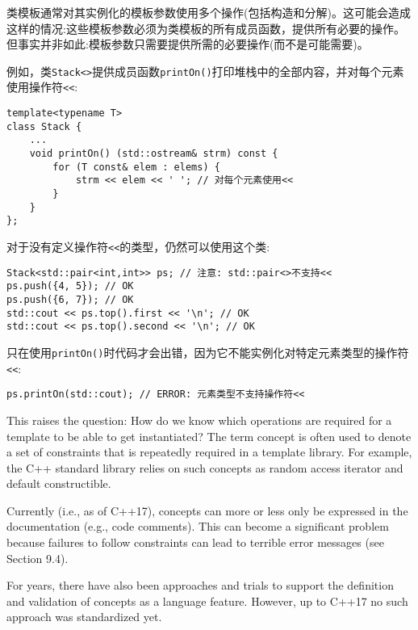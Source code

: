 
类模板通常对其实例化的模板参数使用多个操作(包括构造和分解)。这可能会造成这样的情况:这些模板参数必须为类模板的所有成员函数，提供所有必要的操作。但事实并非如此:模板参数只需要提供所需的必要操作(而不是可能需要)。

例如，类\texttt{Stack<>}提供成员函数\texttt{printOn()}打印堆栈中的全部内容，并对每个元素使用操作符\texttt{<<}:

\begin{lstlisting}[style=styleCXX]
template<typename T>
class Stack {
	...
	void printOn() (std::ostream& strm) const {
		for (T const& elem : elems) {
			strm << elem << ' '; // 对每个元素使用<<
		}
	}
};
\end{lstlisting}

对于没有定义操作符\texttt{<<}的类型，仍然可以使用这个类:

\begin{lstlisting}[style=styleCXX]
Stack<std::pair<int,int>> ps; // 注意: std::pair<>不支持<<
ps.push({4, 5}); // OK
ps.push({6, 7}); // OK
std::cout << ps.top().first << '\n'; // OK
std::cout << ps.top().second << '\n'; // OK
\end{lstlisting}

只在使用\texttt{printOn()}时代码才会出错，因为它不能实例化对特定元素类型的操作符\texttt{<<}:

\begin{lstlisting}[style=styleCXX]
ps.printOn(std::cout); // ERROR: 元素类型不支持操作符<<
\end{lstlisting}


This raises the question: How do we know which operations are required for a template to be able to get instantiated? The term concept is often used to denote a set of constraints that is repeatedly required in a template library. For example, the C++ standard library relies on such concepts as random access iterator and default constructible.

Currently (i.e., as of C++17), concepts can more or less only be expressed in the documentation (e.g., code comments). This can become a significant problem because failures to follow constraints can lead to terrible error messages (see Section 9.4).

For years, there have also been approaches and trials to support the definition and validation of concepts as a language feature. However, up to C++17 no such approach was standardized yet.

